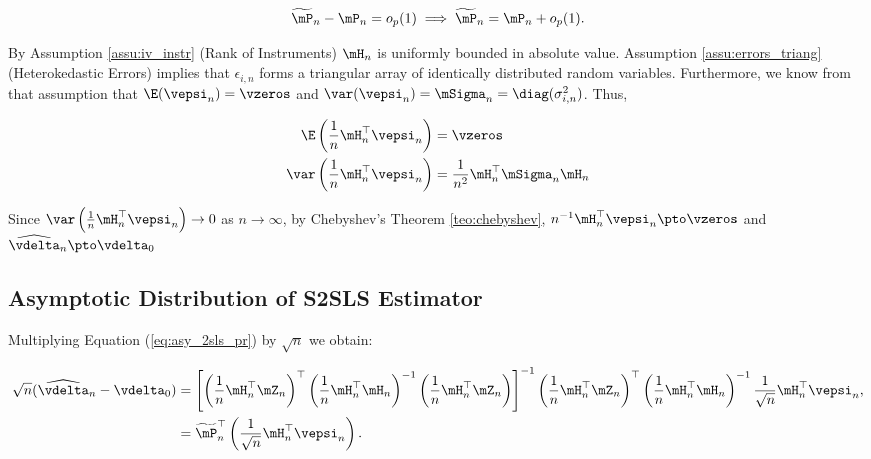 \documentclass[english,12pt]{book}\usepackage[]{graphicx}\usepackage[]{xcolor}
\begin{document}
\begin{equation}\label{eq:P_conver}
\widetilde{\mP}_n - \mP_n = o_p(1)\implies \widetilde{\mP}_n= \mP_n + o_p(1). 
\end{equation}

By Assumption \ref{assu:iv_instr} (Rank of Instruments) $\mH_n$ is uniformly bounded in absolute value. Assumption \ref{assu:errors_triang} (Heterokedastic Errors) implies that $\epsilon_{i,n}$ forms a triangular array of identically distributed random variables. Furthermore, we know from that assumption that  $\E(\vepsi_n) = \vzeros$ and $\var(\vepsi_n) = \mSigma_n =\diag(\sigma^2_{i, n})$. Thus,

\begin{equation*}
  \begin{aligned}
    \E\left(\frac{1}{n}\mH^\top_n\vepsi_n\right)   & = \vzeros \\
    \var\left(\frac{1}{n}\mH^\top_n\vepsi_n\right) & = \frac{1}{n^2}\mH^\top_n\mSigma_n\mH_n
  \end{aligned}
\end{equation*}

Since $\var\left(\frac{1}{n}\mH^\top_n\vepsi_n\right)\to 0$ as $n\to \infty$,  by Chebyshev's Theorem \ref{teo:chebyshev}, $n^{-1}\mH^\top_n\vepsi_n\pto \vzeros$ and $\widehat{\vdelta}_n\pto \vdelta_0$


\subsection{Asymptotic Distribution of S2SLS Estimator}

Multiplying Equation (\ref{eq:asy_2sls_pr}) by $\sqrt{n}$ we obtain:

\begin{equation}\label{eq:asy_2sls_pr2}
\begin{aligned}
\sqrt{n}(\widehat{\vdelta}_{n} - \vdelta_0) & = \left[\left(\frac{1}{n}\mH^\top_n\mZ_n\right)^\top\left(\frac{1}{n}\mH^\top_n\mH_n\right)^{-1}\left(\frac{1}{n}\mH^\top_n\mZ_n\right)\right]^{-1}\left(\frac{1}{n}\mH^\top_n\mZ_n\right)^\top\left(\frac{1}{n}\mH^\top_n\mH_n\right)^{-1}\frac{1}{\sqrt{n}}\mH^\top_n\vepsi_n, \\
             & = \widetilde{\mP}^\top_n\left(\frac{1}{\sqrt{n}}\mH^\top_n\vepsi_n\right).
\end{aligned}
\end{equation}
\end{document}
